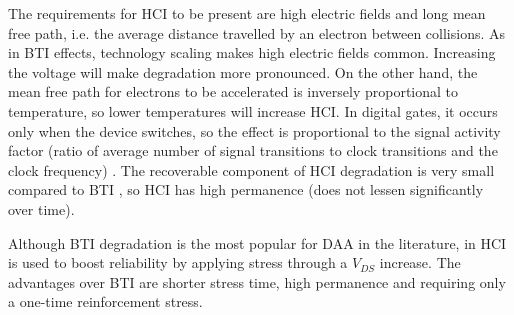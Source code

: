 The requirements for HCI to be present are high electric fields and long mean free path, i.e. the average distance travelled by an electron between collisions. As in BTI effects, technology scaling makes high electric fields common. Increasing the voltage will make degradation more pronounced. On the other hand, the mean free path for electrons to be accelerated is inversely proportional to temperature, so lower temperatures will increase HCI. In digital gates, it occurs only when the device switches, so the effect is proportional to the signal activity factor (ratio of average number of signal transitions to clock transitions and the clock frequency) \cite{Sengupta2017}.  The  recoverable component of HCI degradation is very small compared to BTI \cite{Bhargava2013}, so HCI has high permanence (does not lessen significantly over time).

Although BTI degradation is the most popular for DAA in the literature, in \cite{Bhargava2013} HCI is used to boost reliability by applying stress through a $V_{DS}$ increase. The advantages over BTI are shorter stress time, high permanence and requiring only a one-time reinforcement stress. 













